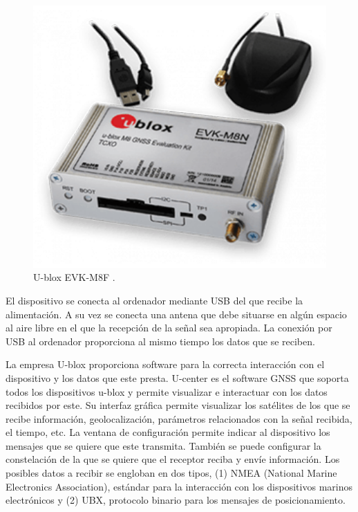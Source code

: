\begin{figure}
	\centering
	\includegraphics[width=1\textwidth]{imagenes/ublox.png}
	\caption{\label{fig1}U-blox EVK-M8F \cite{ublox}.}
\end{figure}

El dispositivo se conecta al ordenador mediante USB del que recibe la alimentación. A su vez se conecta una antena que debe situarse en algún espacio al aire libre en el que la recepción de la señal sea apropiada. La conexión por USB al ordenador proporciona al mismo tiempo los datos que se reciben. \newline

La empresa U-blox proporciona software para la correcta interacción con el dispositivo y los datos que este presta. U-center \cite{ucenter} es el software GNSS que soporta todos los dispositivos u-blox y permite visualizar e interactuar con los datos recibidos por este. Su interfaz gráfica permite visualizar los satélites de los que se recibe información, geolocalización, parámetros relacionados con la señal recibida, el tiempo, etc. La ventana de configuración permite indicar al dispositivo los mensajes que se quiere que este transmita. También se puede configurar la constelación de la que se quiere que el receptor reciba y envíe información. Los posibles datos a recibir se engloban en dos tipos, (1) NMEA (National Marine Electronics Association), estándar para la interacción con los dispositivos marinos electrónicos y (2) UBX, protocolo binario para los mensajes de posicionamiento. \newline

